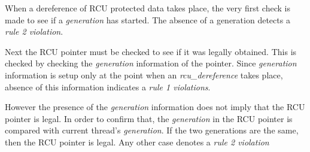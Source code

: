 When a dereference of RCU protected data takes place, the very first check is made
to see if a \emph{generation} has started. The absence of a generation detects
a \emph{rule 2 violation}.

Next the RCU pointer must be checked to see if it was legally obtained. This is checked by checking the
\emph{generation} information of the pointer. Since \emph{generation} information
is setup only at the point when an \emph{rcu\_dereference} takes place, absence
of this information indicates a \emph{rule 1 violations}.

However the presence of the \emph{generation} information does not imply that the RCU
pointer is legal. In order to confirm that, the \emph{generation} in the RCU pointer is
compared with current thread's \emph{generation}. If the two generations are the same,
then the RCU pointer is legal. Any other case denotes a \emph{rule 2 violation}
